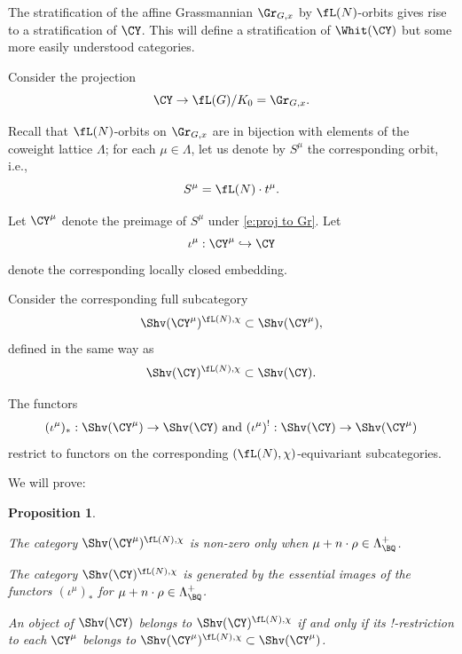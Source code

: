 \documentclass[9pt]{amsart}
\newtheorem{prop}[subsubsection]{Proposition}
\theoremstyle{definition}
\theoremstyle{remark}
\numberwithin{equation}{section}
\begin{document}
  \label{ss:on stratum}

The stratification of the affine Grassmannian $\Gr_{G,x}$ by $\fL(N)$-orbits gives rise to a stratification of $\CY$. 
This will define a stratification of $\Whit(\CY)$ but some more easily understood categories. 


\sssec{}   \label{sss:strata Y}

Consider the projection
\begin{equation} \label{e:proj to Gr}
\CY\to \fL(G)/K_0=\Gr_{G,x}.
\end{equation}

Recall that $\fL(N)$-orbits on $\Gr_{G,x}$ are in bijection with elements of the coweight lattice $\Lambda$; for each
$\mu\in \Lambda$, let us denote by $S^\mu$ the corresponding orbit, i.e.,
$$S^\mu=\fL(N)\cdot t^\mu.$$

\medskip

Let $\CY^\mu$ denote the preimage of $S^\mu$ under \eqref{e:proj to Gr}. Let 
$$\iota^\mu:\CY^\mu\hookrightarrow \CY$$
denote the corresponding locally closed embedding. 

\sssec{}

Consider the corresponding full subcategory
$$\Shv(\CY^\mu)^{\fL(N),\chi}\subset \Shv(\CY^\mu),$$
defined in the same way as
$$\Shv(\CY)^{\fL(N),\chi}\subset \Shv(\CY).$$

The functors
$$(\iota^\mu)_*:\Shv(\CY^\mu)\to \Shv(\CY) \text{ and }
(\iota^\mu)^!:\Shv(\CY)\to \Shv(\CY^\mu)$$
restrict to functors on the corresponding $(\fL(N),\chi)$-equivariant subcategories.

\medskip

We will prove:

\begin{prop}  \label{p:generated} \hfill

\smallskip

 The category
$\Shv(\CY^\mu)^{\fL(N),\chi}$ is non-zero only when $\mu+n\cdot \rho\in \Lambda^+_\BQ$.

\smallskip

 The category $\Shv(\CY)^{\fL(N),\chi}$ is generated by the essential images of the functors 
$(\iota^\mu)_*$ for $\mu+n\cdot \rho\in \Lambda^+_\BQ$. 

\smallskip

 An object of $\Shv(\CY)$ belongs to $\Shv(\CY)^{\fL(N),\chi}$ if and only if its !-restriction to
each $\CY^\mu$ belongs to $\Shv(\CY^\mu)^{\fL(N),\chi}\subset \Shv(\CY^\mu)$. 

\end{prop}
\end{document}

